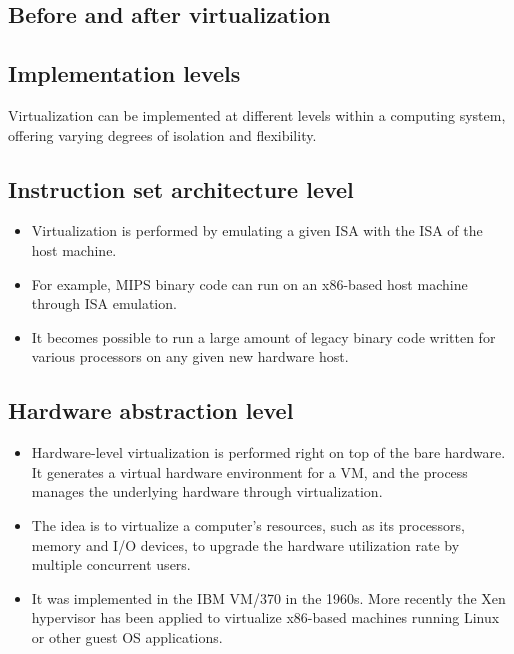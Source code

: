 \documentclass[11pt,a4paper]{article}
\begin{document}
\subsection{Before and after virtualization}

\subsection{Implementation levels}

Virtualization can be implemented at different levels within a computing system, offering
varying degrees of isolation and flexibility.


\newpage
\subsection{Instruction set architecture level}

\begin{itemize}\itemsep2pt
  \item Virtualization is performed by emulating a given ISA with the ISA of the host machine.
  \item For example, MIPS binary code can run on an x86-based host machine through ISA
        emulation.
  \item It becomes possible to run a large amount of legacy binary code written for various
        processors on any given new hardware host.
\end{itemize}

\subsection{Hardware abstraction level}

\begin{itemize}\itemsep2pt
  \item Hardware-level virtualization is performed right on top of the bare hardware. It
        generates a virtual hardware environment for a VM, and the process manages the
        underlying hardware through virtualization.
  \item The idea is to virtualize a computer's resources, such as its processors, memory and
        I/O devices, to upgrade the hardware utilization rate by multiple concurrent users.
  \item It was implemented in the IBM VM/370 in the 1960s. More recently the Xen hypervisor
        has been applied to virtualize x86-based machines running Linux or other guest OS
        applications.
\end{itemize}
\end{document}

